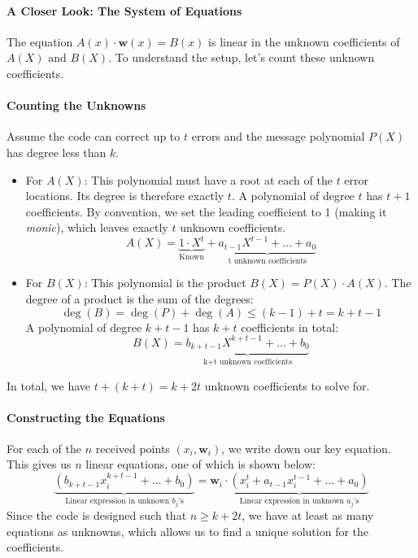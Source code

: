 \documentclass{article}
\begin{document}
\paragraph{A Closer Look: The System of Equations}
The equation $A(x) \cdot \mathbf{w}(x) = B(x)$ is linear in the unknown coefficients of $A(X)$ and $B(X)$. To understand the setup, let's count these unknown coefficients.

\paragraph{Counting the Unknowns}
Assume the code can correct up to $t$ errors and the message polynomial $P(X)$ has degree less than $k$.
\begin{itemize}
    \item For $A(X)$: This polynomial must have a root at each of the $t$ error locations. Its degree is therefore exactly $t$. A polynomial of degree $t$ has $t+1$ coefficients. By convention, we set the leading coefficient to 1 (making it \textit{monic}), which leaves exactly $t$ unknown coefficients.
    \[ A(X) = \underbrace{1 \cdot X^t}_{\text{Known}} + \underbrace{a_{t-1}X^{t-1} + \dots + a_0}_{\text{t unknown coefficients}}\]
    \item For $B(X)$: This polynomial is the product $B(X) = P(X) \cdot A(X)$. The degree of a product is the sum of the degrees:
    \[ \deg(B) = \deg(P) + \deg(A) \le (k-1) + t = k+t-1 \]
    A polynomial of degree $k+t-1$ has $k+t$ coefficients in total:
    \[ B(X) = \underbrace{b_{k+t-1}X^{k+t-1} + \dots + b_0}_{\text{k+t unknown coefficients}} \]
\end{itemize}
In total, we have $t + (k+t) = k+2t$ unknown coefficients to solve for.

\paragraph{Constructing the Equations}
For each of the $n$ received points $(x_i, \mathbf{w}_i)$, we write down our key equation. This gives us $n$ linear equations, one of which is shown below:
\[ \underbrace{(b_{k+t-1}x_i^{k+t-1} + \dots + b_0)}_{\text{Linear expression in unknown } b_j\text{'s}} = \mathbf{w}_i \cdot \underbrace{(x_i^t + a_{t-1}x_i^{t-1} + \dots + a_0)}_{\text{Linear expression in unknown } a_j\text{'s}} \]
Since the code is designed such that $n \ge k+2t$, we have at least as many equations as unknowns, which allows us to find a unique solution for the coefficients.
\end{document}
